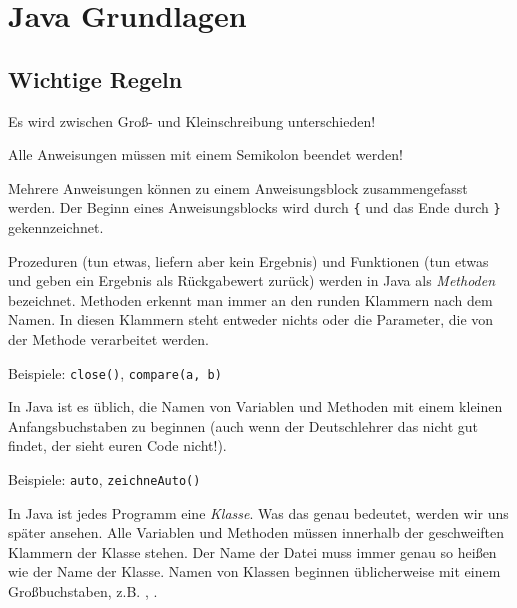 \chapter{Java Grundlagen}
\renewcommand{\chaptertitle}{Java Grundlagen}

\lehead[]{\sf\hspace*{-2.00cm}\textcolor{white}{\colorbox{lightblue}{\makebox[1.60cm][r]{\thechapter}}}\hspace{0.17cm}\textcolor{lightblue}{\chaptertitle}}
\rohead[]{\textcolor{lightblue}{\chaptertitle}\sf\hspace*{0.17cm}\textcolor{white}{\colorbox{lightblue}{\makebox[1.60cm][l]{\thechapter}}}\hspace{-2.00cm}}
\rehead[]{\textcolor{lightblue}{AvHG, Inf, My}}
\lohead[]{\textcolor{lightblue}{AvHG, Inf, My}}

\lstset{style=myJava}


\section{Wichtige Regeln}

\begin{compactitem}
\item Es wird zwischen Groß- und Kleinschreibung unterschieden!

\item Alle Anweisungen müssen mit einem Semikolon beendet werden!

\item Mehrere Anweisungen können zu einem Anweisungsblock zusammengefasst
werden. Der Beginn eines Anweisungsblocks wird durch \lstinline|{| und das Ende
durch \lstinline|}| gekennzeichnet.

\item Prozeduren (tun etwas, liefern aber kein Ergebnis) und Funktionen (tun
etwas und geben ein Ergebnis als Rückgabewert zurück) werden in Java als
\emph{Methoden} bezeichnet. Methoden erkennt man immer an den runden Klammern
nach dem Namen. In diesen Klammern steht entweder nichts oder die Parameter, die
von der Methode verarbeitet werden.

Beispiele: \lstinline|close()|, \lstinline|compare(a, b)|

\item In Java ist es üblich, die Namen von Variablen und Methoden mit einem
kleinen Anfangsbuchstaben zu beginnen (auch wenn der Deutschlehrer das nicht
gut findet, der sieht euren Code nicht!).

Beispiele: \lstinline|auto|, \lstinline|zeichneAuto()|

\item In Java ist jedes Programm eine \emph{Klasse}. Was das genau bedeutet,
werden wir uns später ansehen. Alle Variablen und Methoden müssen innerhalb der
geschweiften Klammern der Klasse stehen. Der Name der Datei muss immer genau so
heißen wie der Name der Klasse. Namen von Klassen beginnen üblicherweise mit
einem Großbuchstaben, z.B. , .
\end{compactitem}


